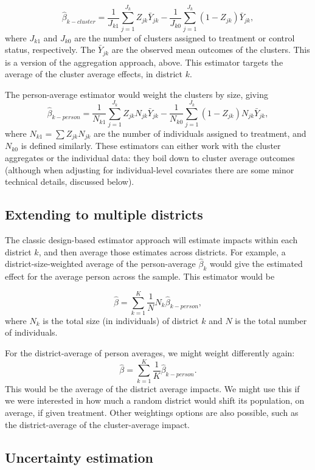 \documentclass[12pt]{article}
\begin{document}
\[
\hat{\beta}_{k-cluster} = \frac{1}{J_{k1}}  \sum_{j=1}^{J_k} Z_{jk} \bar{Y}_{jk} - \frac{1}{J_{k0}} \sum_{j=1}^{J_k} (1-Z_{jk}) \bar{Y}_{jk} ,
\]
where $J_{k1}$ and $J_{k0}$ are the number of clusters assigned to treatment or control status, respectively.
The $\bar{Y}_{jk}$ are the observed mean outcomes of the clusters.
This is a version of the aggregation approach, above.
This estimator targets the average of the cluster average effects, in district $k$.

The person-average estimator would weight the clusters by size, giving
\[
\hat{\beta}_{k-person} = \frac{1}{N_{k1}} \sum_{j=1}^{J_k} Z_{jk} N_{jk} \bar{Y}_{jk} - \frac{1}{N_{k0}} \sum_{j=1}^{J_k} (1-Z_{jk}) N_{jk} \bar{Y}_{jk} ,
\]
where $N_{k1} = \sum Z_{jk} N_{jk}$ are the number of individuals assigned to treatment, and $N_{k0}$ is defined similarly.
These estimators can either work with the cluster aggregates or the individual data: they boil down to cluster average outcomes (although when adjusting for individual-level covariates there are some minor technical details, discussed below).


\subsection{Extending to multiple districts}
The classic design-based estimator approach will estimate impacts within each district $k$, and then average those estimates across districts.
For example, a district-size-weighted average of the person-average $\hat{\beta}_k$ would give the estimated effect for the average person across the sample.
This estimator would be

\[
\hat{\beta} = \sum_{k=1}^K \frac{1}{N} N_{k} \hat{\beta}_{k-person} ,
\]
where $N_k$ is the total size (in individuals) of district $k$ and $N$ is the total number of individuals.

For the district-average of person averages, we might weight differently again:
\[
\hat{\beta} = \sum_{k=1}^K \frac{1}{K} \hat{\beta}_{k-person} .
\]
This would be the average of the district average impacts.
We might use this if we were interested in how much a random district would shift its population, on average, if given treatment.
Other weightings options are also possible, such as the district-average of the cluster-average impact.


\subsection{Uncertainty estimation}
\end{document}
